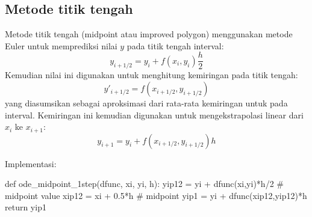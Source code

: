 \subsection{Metode titik tengah}

Metode titik tengah (midpoint atau improved polygon)
menggunakan metode Euler untuk memprediksi nilai $y$ pada titik tengah
interval:
\begin{equation*}
y_{i+1/2} = y_{i} + f(x_i, y_i) \frac{h}{2}
\end{equation*}
Kemudian nilai ini digunakan untuk menghitung kemiringan pada titik tengah:
\begin{equation*}
y'_{i+1/2} = f(x_{i+1/2}, y_{i+1/2})
\end{equation*}
yang diasumsikan sebagai aproksimasi dari rata-rata kemiringan untuk pada interval.
Kemiringan ini kemudian digunakan untuk mengekstrapolasi linear dari $x_i$ ke $x_{i+1}$:
\begin{equation}
y_{i+1} = y_{i} + f(x_{i+1/2}, y_{i+1/2}) h
\end{equation}

Implementasi:
\begin{pythoncode}
def ode_midpoint_1step(dfunc, xi, yi, h):
    yip12 = yi + dfunc(xi,yi)*h/2  # midpoint value
    xip12 = xi + 0.5*h             # midpoint
    yip1 = yi + dfunc(xip12,yip12)*h
    return yip1
\end{pythoncode}
